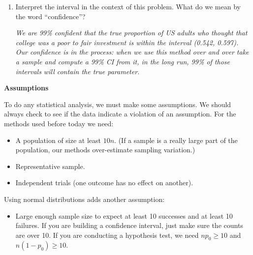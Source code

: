 \begin{enumerate}
\begin{enumerate}
     How similar is the standard error from \ref{propSE} to the
     bootstrap SE?        
\begin{students}
        \vspace{2cm}         
\end{students}

\begin{key}
  {\it Very close. Off just by round off error?}
\end{key}

\item Interpret the interval in the context of this problem.  What do
  we mean by the word ``confidence''?    
\begin{students}
        \vspace{3cm}        
\end{students}

\begin{key}
  {\it We are 99\% confident that the true proportion of US adults
  who thought that college was a poor to fair investment is within the
interval (0.542, 0.597). Our confidence is in the process: when we use
this method over and over take a sample and compute a 99\% CI from it,
in the long run, 99\% of those intervals will contain the true parameter.}
\end{key}
     \end{enumerate}
   \end{enumerate}
 

     \begin{center}
       {\large\bf Assumptions}
     \end{center}

  To do any statistical analysis, we must make some assumptions.  We
  should always check to see if the data indicate a violation of an
  assumption. For the methods used before today we need:
     \begin{itemize}
     \item A population of size at least $10n$. 
       (If a sample is a really large part of the population, our
       methods over-estimate sampling variation.) 
     \item Representative sample. 
     \item Independent trials (one outcome has no effect on another).  
     \end{itemize}
   
  Using normal distributions adds another assumption:
   \begin{itemize}
     \item Large enough sample size to expect at least 10
       successes   and  at least 10  failures.  If you are building a
       confidence interval, just make sure the counts are over 10. If
       you are conducting a hypothesis test, we need $np_0\geq 10$ and
       $n(1-p_0) \geq 10$. 
     \end{itemize}\vspace{1cm}



